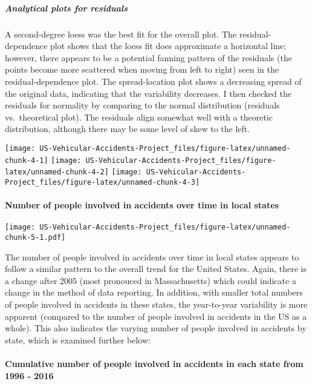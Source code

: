 \documentclass[]{article}
\let\oldparagraph\paragraph
\renewcommand{\paragraph}[1]{\oldparagraph{#1}\mbox{}}
\let\oldsubparagraph\subparagraph
\renewcommand{\subparagraph}[1]{\oldsubparagraph{#1}\mbox{}}
\begin{document}
\hypertarget{analytical-plots-for-residuals}{%
\subparagraph{Analytical plots for
residuals}\label{analytical-plots-for-residuals}}

A second-degree loess was the best fit for the overall plot. The
residual-dependence plot shows that the loess fit does approximate a
horizontal line; however, there appears to be a potential fanning
pattern of the residuals (the points become more scattered when moving
from left to right) seen in the residual-dependence plot. The
spread-location plot shows a decreasing spread of the original data,
indicating that the variability decreases. I then checked the residuals
for normality by comparing to the normal distribution (residuals
vs.~theoretical plot). The residuals align somewhat well with a
theoretic distribution, although there may be some level of skew to the
left.

\texttt{[image: US-Vehicular-Accidents-Project\_files/figure-latex/unnamed-chunk-4-1]}
\texttt{[image: US-Vehicular-Accidents-Project\_files/figure-latex/unnamed-chunk-4-2]}
\texttt{[image: US-Vehicular-Accidents-Project\_files/figure-latex/unnamed-chunk-4-3]}

\hypertarget{number-of-people-involved-in-accidents-over-time-in-local-states}{%
\paragraph{Number of people involved in accidents over time in local
states}\label{number-of-people-involved-in-accidents-over-time-in-local-states}}

\texttt{[image: US-Vehicular-Accidents-Project\_files/figure-latex/unnamed-chunk-5-1.pdf]}

The number of people involved in accidents over time in local states
appears to follow a similar pattern to the overall trend for the United
States. Again, there is a change after 2005 (most pronouced in
Massachusetts) which could indicate a change in the method of data
reporting. In addition, with smaller total numbers of people involved in
accidents in these states, the year-to-year variability is more apparent
(compared to the number of people involved in accidents in the US as a
whole). This also indicates the varying number of people involved in
accidents by state, which is examined further below:

\hypertarget{cumulative-number-of-people-involved-in-accidents-in-each-state-from-1996---2016}{%
\paragraph{Cumulative number of people involved in accidents in each
state from 1996 -
2016}\label{cumulative-number-of-people-involved-in-accidents-in-each-state-from-1996---2016}}
\end{document}
